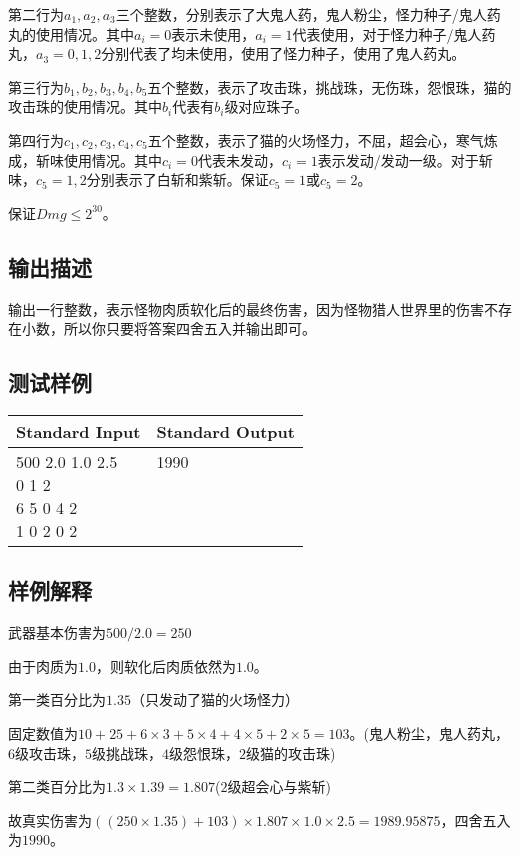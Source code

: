 第二行为$a_1,a_2,a_3$三个整数，分别表示了大鬼人药，鬼人粉尘，怪力种子/鬼人药丸的使用情况。其中$a_i=0$表示未使用，$a_i=1$代表使用，对于怪力种子/鬼人药丸，$a_3=0,1,2$分别代表了均未使用，使用了怪力种子，使用了鬼人药丸。

第三行为$b_1,b_2,b_3,b_4,b_5$五个整数，表示了攻击珠，挑战珠，无伤珠，怨恨珠，猫的攻击珠的使用情况。其中$b_i$代表有$b_i$级对应珠子。

第四行为$c_1,c_2,c_3,c_4,c_5$五个整数，表示了猫的火场怪力，不屈，超会心，寒气炼成，斩味使用情况。其中$c_i=0$代表未发动，$c_i=1$表示发动/发动一级。对于斩味，$c_5=1,2$分别表示了白斩和紫斩。保证$c_5=1$或$c_5=2$。

保证$Dmg \le 2^{30}$。

\subsection*{输出描述}

输出一行整数，表示怪物肉质软化后的最终伤害，因为怪物猎人世界里的伤害不存在小数，所以你只要将答案四舍五入并输出即可。

\subsection*{测试样例}

\begin{table}[H]
\begin{tabularx}{\textwidth}{|X|X|}
    \hline
    \textbf{Standard Input} & \textbf{Standard Output} \\ 
    \hline 
    \tablecell{
        500 2.0 1.0 2.5 \\
        0 1 2 \\
        6 5 0 4 2 \\
        1 0 2 0 2 \\
    } & 
    \tablecell{ 1990 \\ \\ \\ \\} \\
    \hline
\end{tabularx}
\end{table}
\subsection*{样例解释}
武器基本伤害为$500/2.0=250$

由于肉质为$1.0$，则软化后肉质依然为$1.0$。

第一类百分比为$1.35$（只发动了猫的火场怪力）

固定数值为$10+25+6\times3+5\times4+4\times5+2\times5=103$。(鬼人粉尘，鬼人药丸，$6$级攻击珠，$5$级挑战珠，$4$级怨恨珠，$2$级猫的攻击珠)

第二类百分比为$1.3\times1.39=1.807$($2$级超会心与紫斩)

故真实伤害为$((250\times 1.35)+103)\times 1.807\times 1.0\times 2.5=1989.95875$，四舍五入为$1990$。